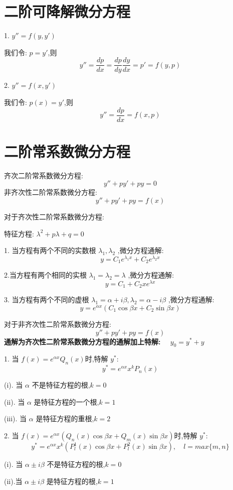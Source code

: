 \section{二阶可降解微分方程}
\begin{definition}

	1. $y''=f(y,y')$

	我们令:  $p=y'$,则 $$y''=\frac{dp}{dx}=\frac{dp}{dy}\frac{dy}{dx}=p'=f(y,p)$$

	2. $y''=f(x,y')$

	我们令:  $p(x)=y'$,则
	$$y''=\frac{dp}{dx}=f(x,p)$$
\end{definition}
\section{二阶常系数微分方程}
\begin{definition}[二阶常系数微分方程]
	齐次二阶常系数微分方程:
	$$y''+py'+py=0$$
	非齐次性二阶常系数微分方程:
	$$y''+py'+py=f(x)$$
\end{definition}
\begin{theorem}\label{the: 二阶常系数微分方程}
	对于齐次性二阶常系数微分方程:

	特征方程:  $\lambda^{2}+p\lambda+q=0$

	1. 当方程有两个不同的实数根 $\lambda_{1},\lambda_{2}$ ,微分方程通解: $$y=C_{1}e^{\lambda_{1} x}+C_{2}e^{\lambda_{2}x}$$

	2.当方程有两个相同的实根 $\lambda_{1}=\lambda_{2}=\lambda$ ,微分方程通解: $$y=C_{1}+C_{2}xe^{\lambda x}$$

	3. 当方程有两个不同的虚根 $\lambda_{1}=\alpha +i\beta,\lambda_{2}=\alpha-i\beta$ ,微分方程通解: $$y=e^{\alpha x}(C_{1}\cos \beta x+C_{2}\sin \beta x)$$
\end{theorem}
\begin{theorem}[二阶常系数微分方程解]
	对于非齐次性二阶常系数微分方程:
	$$y''+py'+py=f(x)$$
	\textbf{通解为齐次性二阶常系数微分方程的通解加上特解: $\quad y_{0}=y^{*}+y$}

	1. 当 $f(x)=e^{\alpha x}Q_{n}(x)$时,特解 $y^{*}$:
	$$y^{*}=e^{\alpha x}x^{k}P_{n}(x)$$

	(i). 当 $\alpha$ 不是特征方程的根,$k=0$

	(ii). 当 $\alpha$ 是特征方程的一个根,$k=1$

	(iii). 当 $\alpha$ 是特征方程的重根,$k=2$

	2. 当 $f(x)=e^{\alpha x}(Q_{n}(x)\cos \beta x+Q_{m}(x)\sin \beta x)$时,特解 $y^{*}$:
	$$y^{*}=e^{\alpha x}x^{k}(P_{l}^{1}(x)\cos \beta x+P_{l}^{2}(x)\sin \beta x),\quad l=max\{m,n\}$$

	(i). 当 $\alpha\pm i\beta$ 不是特征方程的根,$k=0$

	(ii).当 $\alpha\pm i\beta$ 是特征方程的根,$k=1$
\end{theorem}
